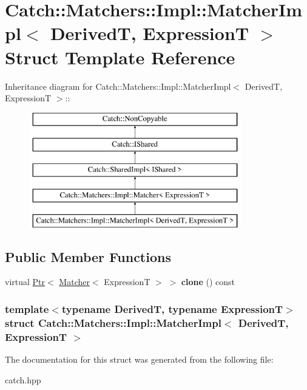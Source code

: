 \hypertarget{structCatch_1_1Matchers_1_1Impl_1_1MatcherImpl}{
\section{Catch::Matchers::Impl::MatcherImpl$<$ DerivedT, ExpressionT $>$ Struct Template Reference}
\label{structCatch_1_1Matchers_1_1Impl_1_1MatcherImpl}
}
Inheritance diagram for Catch::Matchers::Impl::MatcherImpl$<$ DerivedT, ExpressionT $>$::\begin{figure}[H]
\begin{center}
\leavevmode
\includegraphics[height=5cm]{structCatch_1_1Matchers_1_1Impl_1_1MatcherImpl}
\end{center}
\end{figure}
\subsection*{Public Member Functions}
\begin{DoxyCompactItemize}
\item 
\hypertarget{structCatch_1_1Matchers_1_1Impl_1_1MatcherImpl_afe2e10779f91394f80ff5c894fb1bfab}{
virtual \hyperlink{classCatch_1_1Ptr}{Ptr}$<$ \hyperlink{structCatch_1_1Matchers_1_1Impl_1_1Matcher}{Matcher}$<$ ExpressionT $>$ $>$ {\bfseries clone} () const }
\label{structCatch_1_1Matchers_1_1Impl_1_1MatcherImpl_afe2e10779f91394f80ff5c894fb1bfab}

\end{DoxyCompactItemize}
\subsubsection*{template$<$typename DerivedT, typename ExpressionT$>$ struct Catch::Matchers::Impl::MatcherImpl$<$ DerivedT, ExpressionT $>$}



The documentation for this struct was generated from the following file:\begin{DoxyCompactItemize}
\item 
catch.hpp\end{DoxyCompactItemize}
